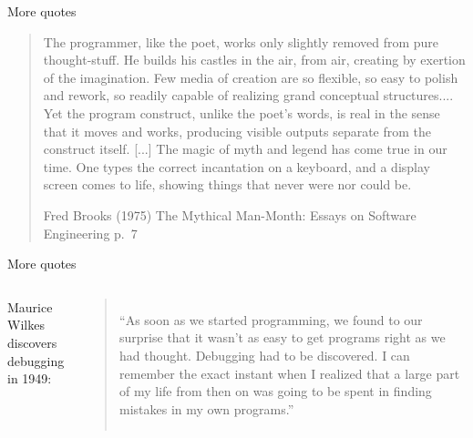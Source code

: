 \documentclass[aspectratio=169,usenames,dvipsnames]{beamer}
\begin{document}
\begin{frame}{More quotes}
    \begin{quote}\normalfont
    The programmer, like the poet, works only slightly removed from pure
    thought-stuff. He builds his castles in the air, from air, creating by
    exertion of the imagination. Few media of creation are so flexible, so
    easy to polish and rework, so readily capable of realizing grand
    conceptual structures....
    Yet the program construct, unlike the poet's words, is real in the sense
    that it moves and works, producing visible outputs separate from the
    construct itself. [...] The magic of myth and legend has come true in our
    time. One types the correct incantation on a keyboard, and a display
    screen comes to life, showing things that never were nor could be.

	\vspace{1em}
    Fred Brooks (1975) The Mythical Man-Month: Essays on Software Engineering
    p.\ 7
    \end{quote}
\end{frame}

%
%
%
%

%

\begin{frame}{More quotes}
    \begin{columns}
    Maurice Wilkes discovers debugging in 1949:

    \vspace{1em}
    \begin{quote}\normalfont
    ``As soon as we started programming, we found to our surprise that it
    wasn't as easy to get programs right as we had thought. Debugging had to be
    discovered. I can remember the exact instant when I realized that a large
    part of my life from then on was going to be spent in finding mistakes in
    my own programs.''
    \end{quote}
    \end{columns}
\end{frame}
\end{document}
